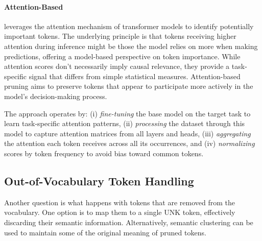 \documentclass[twocolumn]{article}
\begin{document}

\paragraph{Attention-Based}
leverages the attention mechanism of transformer models to identify potentially important tokens. The underlying principle is that tokens receiving higher attention during inference might be those the model relies on more when making predictions, offering a model-based perspective on token importance. While attention scores don't necessarily imply causal relevance, they provide a task-specific signal that differs from simple statistical measures. Attention-based pruning aims to preserve tokens that appear to participate more actively in the model's decision-making process.

The approach operates by:
(i) \textit{fine-tuning} the base model on the target task to learn task-specific attention patterns,
(ii) \textit{processing} the dataset through this model to capture attention matrices from all layers and heads,
(iii) \textit{aggregating} the attention each token receives across all its occurrences, and
(iv) \textit{normalizing} scores by token frequency to avoid bias toward common tokens.

\subsection{Out-of-Vocabulary Token Handling}
Another question is what happens with tokens that are removed from the vocabulary. 
One option is to map them to a single UNK token, effectively discarding their semantic information.
Alternatively, semantic clustering can be used to maintain some of the original meaning of pruned tokens.
\end{document}
